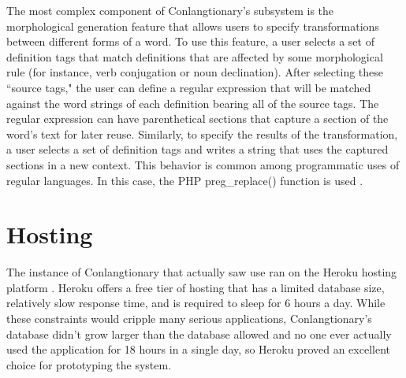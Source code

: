 The most complex component of Conlangtionary's subsystem is the morphological generation feature that allows users to specify transformations between different forms of a word. To use this feature, a user selects a set of definition tags that match definitions that are affected by some morphological rule (for instance, verb conjugation or noun declination). After selecting these ``source tags," the user can define a regular expression that will be matched against the word strings of each definition bearing all of the source tags. The regular expression can have parenthetical sections that capture a section of the word's text for later reuse. Similarly, to specify the results of the transformation, a user selects a set of definition tags and writes a string that uses the captured sections in a new context. This behavior is common among programmatic uses of regular languages. In this case, the PHP preg\_replace() function is used \cite{pregreplace}.

\section{Hosting}
\label{sec:hosting}

The instance of Conlangtionary that actually saw use ran on the Heroku hosting platform \cite{heroku}. Heroku offers a free tier of hosting that has a limited database size, relatively slow response time, and is required to sleep for 6 hours a day. While these constraints would cripple many serious applications, Conlangtionary's database didn't grow larger than the database allowed and no one ever actually used the application for 18 hours in a single day, so Heroku proved an excellent choice for prototyping the system.
